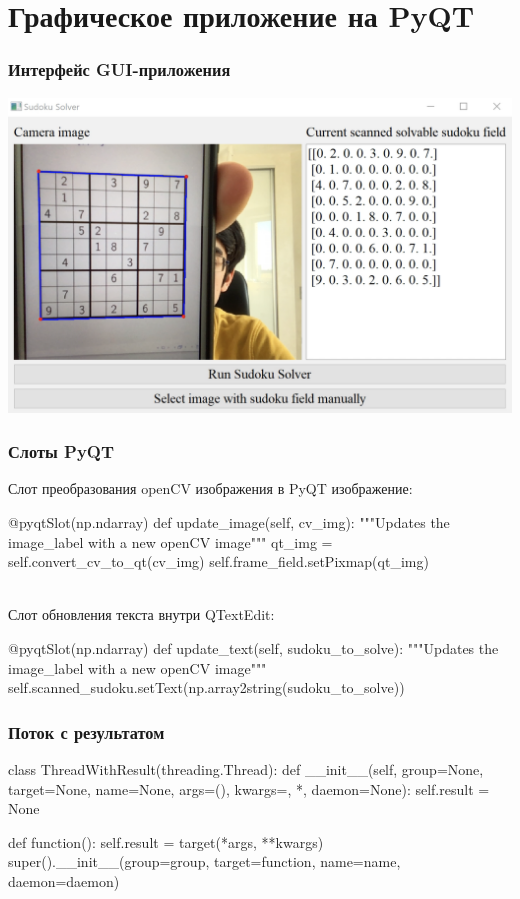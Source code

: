 \documentclass{beamer}
\begin{document}
\section{Графическое приложение на PyQT}

\begin{frame}
\frametitle{Интерфейс GUI-приложения}
\includegraphics[width=\textwidth]{sudoku_app_in_action}
\end{frame}

\begin{frame}[fragile]
\frametitle{Слоты PyQT}

Слот преобразования openCV изображения в PyQT изображение:
\begin{pythoncode}
    @pyqtSlot(np.ndarray)
    def update_image(self, cv_img):
        """Updates the image_label with a new openCV image"""
        qt_img = self.convert_cv_to_qt(cv_img)
        self.frame_field.setPixmap(qt_img)
\end{pythoncode}
\ \\
Слот обновления текста внутри QTextEdit:
\begin{pythoncode}
    @pyqtSlot(np.ndarray)
    def update_text(self, sudoku_to_solve):
        """Updates the image_label with a new openCV image"""
        self.scanned_sudoku.setText(np.array2string(sudoku_to_solve))
\end{pythoncode}

\end{frame}


\begin{frame}[fragile]
\frametitle{Поток с результатом}
\begin{pythoncode}
class ThreadWithResult(threading.Thread):
    def __init__(self, group=None, target=None, name=None,
                 args=(), kwargs={}, *, daemon=None):
        self.result = None

        def function():
            self.result = target(*args, **kwargs)
        super().__init__(group=group, target=function,
                         name=name, daemon=daemon)
\end{pythoncode}

\end{frame}
\end{document}
